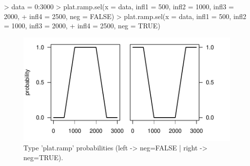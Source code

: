\documentclass[letterpaper, 12pt]{article}
\begin{document}
\begin{Schunk}
\begin{Sinput}
> data = 0:3000
> plat.ramp.sel(x = data, infl1 = 500, infl2 = 1000, infl3 = 2000, 
+     infl4 = 2500, neg = FALSE)
> plat.ramp.sel(x = data, infl1 = 500, infl2 = 1000, infl3 = 2000, 
+     infl4 = 2500, neg = TRUE)
\end{Sinput}
\end{Schunk}
\begin{figure}[h]
\vspace{-20pt}
\begin{center}
\includegraphics{relation_sel-019}
\end{center}
\vspace{-30pt}
\caption{Type 'plat.ramp' probabilities (left -> neg=FALSE |  right -> neg=TRUE).}
\vspace{-10pt}
\label{fig9}
\end{figure}
\end{document}
